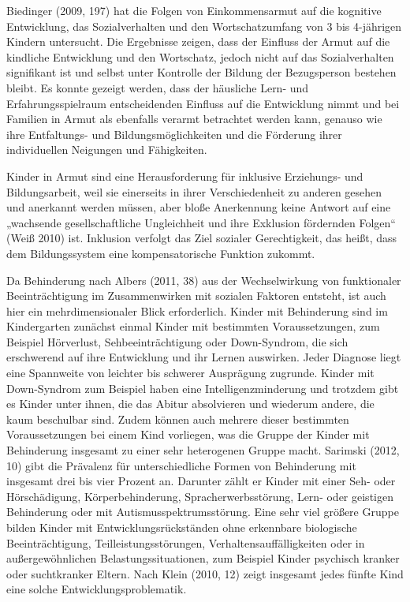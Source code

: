 Biedinger (2009, 197) hat die Folgen von Einkommensarmut auf die kognitive Entwicklung, das Sozialverhalten und den Wortschatzumfang von 3 bis 4-jährigen Kindern untersucht. Die Ergebnisse zeigen, dass der Einfluss der Armut auf die kindliche Entwicklung und den Wortschatz, jedoch nicht auf das Sozialverhalten signifikant ist und selbst unter Kontrolle der Bildung der Bezugsperson bestehen bleibt. Es konnte gezeigt werden, dass der häusliche Lern- und Erfahrungsspielraum entscheidenden Einfluss auf die Entwicklung nimmt und bei Familien in Armut als ebenfalls verarmt betrachtet werden kann, genauso wie ihre Entfaltungs- und Bildungsmöglichkeiten und die Förderung ihrer individuellen Neigungen und Fähigkeiten.

Kinder in Armut sind eine Herausforderung für inklusive Erziehungs- und Bildungsarbeit, weil sie einerseits in ihrer Verschiedenheit zu anderen gesehen und anerkannt werden müssen, aber bloße Anerkennung keine Antwort auf eine „wachsende gesellschaftliche Ungleichheit und ihre Exklusion fördernden Folgen“ (Weiß 2010) ist. Inklusion verfolgt das Ziel sozialer Gerechtigkeit, das heißt, dass dem Bildungssystem eine kompensatorische Funktion zukommt.       
 
Da Behinderung nach Albers (2011, 38) aus der Wechselwirkung von funktionaler Beeinträchtigung im Zusammenwirken mit sozialen Faktoren entsteht, ist auch hier ein mehrdimensionaler Blick erforderlich. Kinder mit Behinderung sind im Kindergarten zunächst einmal Kinder mit bestimmten Voraussetzungen, zum Beispiel Hörverlust, Sehbeeinträchtigung oder Down-Syndrom, die sich erschwerend auf ihre Entwicklung und ihr Lernen auswirken. Jeder Diagnose liegt eine Spannweite von leichter bis schwerer Ausprägung zugrunde. Kinder mit Down-Syndrom zum Beispiel haben eine Intelligenzminderung und trotzdem gibt es Kinder unter ihnen, die das Abitur absolvieren und wiederum andere, die kaum beschulbar sind. Zudem können auch mehrere dieser bestimmten Voraussetzungen bei einem Kind vorliegen, was die Gruppe der Kinder mit Behinderung insgesamt zu einer sehr heterogenen Gruppe macht. Sarimski (2012, 10) gibt die Prävalenz für unterschiedliche Formen von Behinderung mit insgesamt drei bis vier Prozent an. Darunter zählt er Kinder mit einer Seh- oder Hörschädigung, Körperbehinderung, Spracherwerbs\-störung, Lern- oder geistigen Behinderung oder mit Autismusspektrumsstörung. 
Eine sehr viel größere Gruppe bilden Kinder mit Entwicklungsrückständen ohne erkennbare biologische Beeinträchtigung, Teilleistungsstörungen, Verhaltensauffälligkeiten oder in außergewöhnlichen Belastungssituationen, zum Beispiel Kinder psychisch kranker oder suchtkranker Eltern. Nach Klein (2010, 12) zeigt insgesamt jedes fünfte Kind eine solche Entwicklungsproblematik. 

